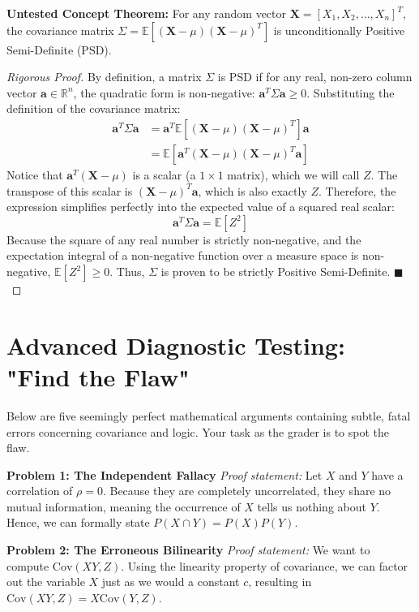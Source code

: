 \documentclass[11pt, a4paper]{article}
\theoremstyle{definition}
\theoremstyle{remark}
\newcommand{\R}{\mathbb{R}}
\newcommand{\E}{\mathbb{E}}
\newcommand{\Cov}{\mathrm{Cov}}
\begin{document}
\textbf{Untested Concept Theorem:} For any random vector $\mathbf{X} = [X_1, X_2, \dots, X_n]^T$, the covariance matrix $\Sigma = \E[(\mathbf{X} - \mu)(\mathbf{X} - \mu)^T]$ is unconditionally Positive Semi-Definite (PSD).

\begin{proof}[Rigorous Proof]
By definition, a matrix $\Sigma$ is PSD if for any real, non-zero column vector $\mathbf{a} \in \R^n$, the quadratic form is non-negative: $\mathbf{a}^T \Sigma \mathbf{a} \ge 0$.
Substituting the definition of the covariance matrix:
\begin{align*}
\mathbf{a}^T \Sigma \mathbf{a} &= \mathbf{a}^T \E[(\mathbf{X} - \mu)(\mathbf{X} - \mu)^T] \mathbf{a} \\
&= \E[\mathbf{a}^T (\mathbf{X} - \mu)(\mathbf{X} - \mu)^T \mathbf{a}]
\end{align*}
Notice that $\mathbf{a}^T (\mathbf{X} - \mu)$ is a scalar (a $1 \times 1$ matrix), which we will call $Z$.
The transpose of this scalar is $(\mathbf{X} - \mu)^T \mathbf{a}$, which is also exactly $Z$.
Therefore, the expression simplifies perfectly into the expected value of a squared real scalar:
\[
\mathbf{a}^T \Sigma \mathbf{a} = \E[Z^2]
\]
Because the square of any real number is strictly non-negative, and the expectation integral of a non-negative function over a measure space is non-negative, $\E[Z^2] \ge 0$. Thus, $\Sigma$ is proven to be strictly Positive Semi-Definite. $\blacksquare$
\end{proof}

\section{Advanced Diagnostic Testing: "Find the Flaw"}

Below are five seemingly perfect mathematical arguments containing subtle, fatal errors concerning covariance and logic. Your task as the grader is to spot the flaw.

\textbf{Problem 1: The Independent Fallacy}
\textit{Proof statement:} Let $X$ and $Y$ have a correlation of $\rho=0$. Because they are completely uncorrelated, they share no mutual information, meaning the occurrence of $X$ tells us nothing about $Y$. Hence, we can formally state $P(X \cap Y) = P(X)P(Y)$.

\textbf{Problem 2: The Erroneous Bilinearity}
\textit{Proof statement:} We want to compute $\Cov(X Y, Z)$. Using the linearity property of covariance, we can factor out the variable $X$ just as we would a constant $c$, resulting in $\Cov(X Y, Z) = X \Cov(Y, Z)$.
\end{document}
